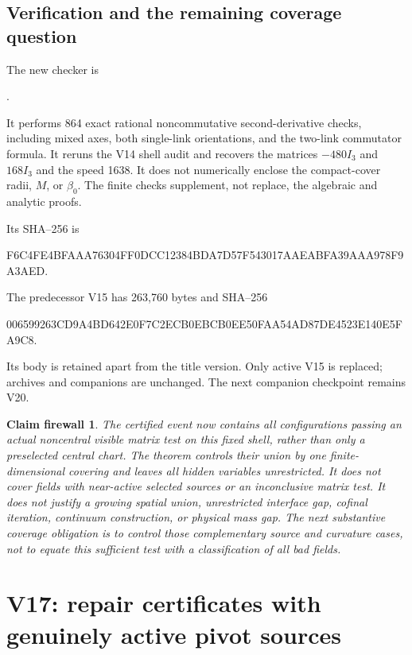 \documentclass[11pt,oneside]{article}
\newtheorem{firewall}[theorem]{Claim firewall}
\begin{document}
\subsection{Verification and the remaining coverage question}

The new checker is
\begin{center}\small
{}.
\end{center}
It performs 864 exact rational noncommutative
second-derivative checks, including mixed axes,
both single-link orientations, and the two-link
commutator formula. It reruns the V14 shell audit
and recovers the matrices \(-480I_3\) and \(168I_3\)
and the speed 1638. It does not numerically enclose
the compact-cover radii, \(M\), or \(\beta_0\).
The finite checks supplement, not replace, the
algebraic and analytic proofs.

Its SHA--256 is
\begin{center}\scriptsize\ttfamily
F6C4FE4BFAAA76304FF0DCC12384BDA7D57F543017AAEABFA39AAA978F9A3AED.
\end{center}
The predecessor V15 has 263,760 bytes and SHA--256
\begin{center}\scriptsize\ttfamily
006599263CD9A4BD642E0F7C2ECB0EBCB0EE50FAA54AD87DE4523E140E5FA9C8.
\end{center}
Its body is retained apart from the title version.
Only active V15 is replaced; archives and companions
are unchanged. The next companion checkpoint remains V20.

\begin{firewall}
The certified event now contains all configurations
passing an actual noncentral visible matrix test on
this fixed shell, rather than only a preselected
central chart. The theorem controls their union by
one finite-dimensional covering and leaves all hidden
variables unrestricted. It does not cover fields
with near-active selected sources or an inconclusive
matrix test. It does not justify a growing spatial
union, unrestricted interface gap, cofinal iteration,
continuum construction, or physical mass gap.
The next substantive coverage obligation is to
control those complementary source and curvature
cases, not to equate this sufficient test with a
classification of all bad fields.
\end{firewall}
\section{V17: repair certificates with genuinely active pivot sources}
\label{sec:f13v17}
\end{document}
